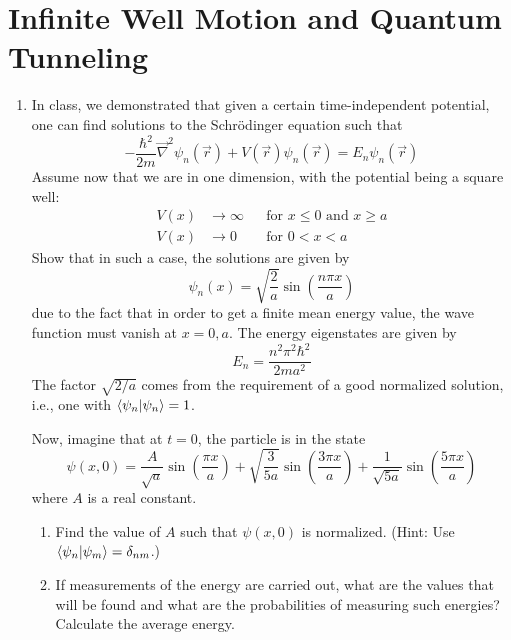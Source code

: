 \documentclass[../psets.tex]{subfiles}
\begin{document}
\section{Infinite Well Motion and Quantum Tunneling}
\begin{enumerate}
    \item {}In class, we demonstrated that given a certain time-independent potential, one can ﬁnd solutions to the Schr\"{o}dinger equation such that
    \begin{equation}
        -\frac{\hbar^2}{2m}\vec{\nabla}^2\psi_n(\vec{r})+V(\vec{r})\psi_n(\vec{r}) = E_n\psi_n(\vec{r})
    \end{equation}
    Assume now that we are in one dimension, with the potential being a square well:
    \begin{equation}
        \begin{aligned}
            V(x) &\to \infty && \text{for }x\leq 0\text{ and }x\geq a\\
            V(x) &\to 0      && \text{for }0<x<a
        \end{aligned}
    \end{equation}
    Show that in such a case, the solutions are given by
    \begin{equation}
        \psi_n(x) = \sqrt{\frac{2}{a}}\sin(\frac{n\pi x}{a})
    \end{equation}
    due to the fact that in order to get a finite mean energy value, the wave function must vanish at $x=0,a$. The energy eigenstates are given by
    \begin{equation}
        E_n = \frac{n^2\pi^2\hbar^2}{2ma^2}
    \end{equation}
    The factor $\sqrt{2/a}$ comes from the requirement of a good normalized solution, i.e., one with $\braket{\psi_n}=1$.\par
    Now, imagine that at $t=0$, the particle is in the state
    \begin{equation}\label{eqn:PS2E5}
        \psi(x,0) = \frac{A}{\sqrt{a}}\sin(\frac{\pi x}{a})+\sqrt{\frac{3}{5a}}\sin(\frac{3\pi x}{a})+\frac{1}{\sqrt{5a}}\sin(\frac{5\pi x}{a})
    \end{equation}
    where $A$ is a real constant.
    \begin{enumerate}
        \item Find the value of $A$ such that $\psi(x,0)$ is normalized. (Hint: Use $\braket{\psi_n}{\psi_m}=\delta_{nm}$.)
        \item If measurements of the energy are carried out, what are the values that will be found and what are the probabilities of measuring such energies? Calculate the average energy.

\end{enumerate}
\end{enumerate}
\end{document}
